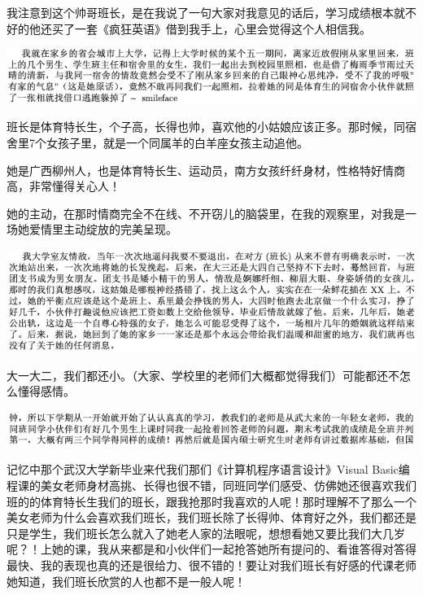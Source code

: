 \documentclass[9pt, b5paper]{article}
\begin{document}
我注意到这个帅哥班长，是在我说了一句大家对我意见的话后，学习成绩根本就不好的他还买了一套《疯狂英语》借到我手上，心里会觉得这个人相信我。 

\begin{center}
\includegraphics[width=.9\linewidth]{./pic/backups_plans_20210422_103713.png}
\end{center}

班长是体育特长生，个子高，长得也帅，喜欢他的小姑娘应该正多。那时候，同宿舍里7个女孩子里，就是一个同属羊的白羊座女孩主动追他。

她是广西柳州人，也是体育特长生、运动员，南方女孩纤纤身材，性格特好情商高，非常懂得关心人！

她的主动，在那时情商完全不在线、不开窃儿的脑袋里，在我的观察里，对我是一场她爱情里主动绽放的完美呈现。

\begin{center}
\includegraphics[width=.9\linewidth]{./pic/backups_plans_20210422_104038.png}
\end{center}

大一大二，我们都还小。（大家、学校里的老师们大概都觉得我们）可能都还不怎么懂得感情。

\begin{center}
\includegraphics[width=.9\linewidth]{./pic/backups_plans_20210422_183816.png}
\end{center}

记忆中那个武汉大学新毕业来代我们那们《计算机程序语言设计》Visual Basic编程课的美女老师身材高挑、长得也很不错，同班同学们感受、仿佛她还很喜欢我们班的的体育特长生我们的班长，跟我抢那时我喜欢的人呢！那时理解不了那么一个美女老师为什么会喜欢我们班长，我们班长除了长得帅、体育好之外，我们都还是只是学生，我们班长怎么就入了她老人家的法眼呢，想想看她又要比我们大几岁呢？！上她的课，我从来都是和小伙伴们一起抢答她所有提问的、看谁答得对答得最快、我的表现也真的还是很给力、很不错的！要让对我们班长有好感的代课老师她知道，我们班长欣赏的人也都不是一般人呢！
\end{document}
